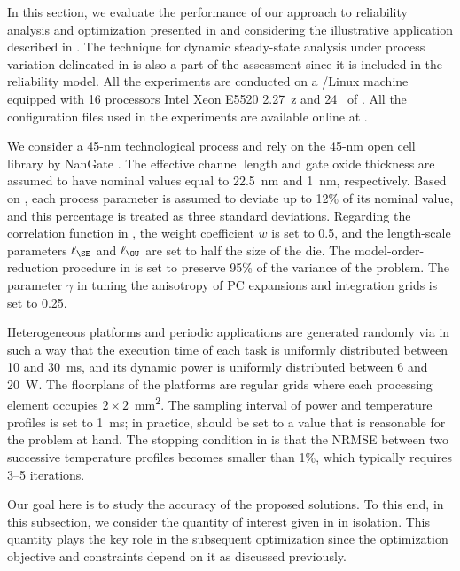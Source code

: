In this section, we evaluate the performance of our approach to reliability
analysis and optimization presented in  and
 considering the illustrative application
described in . The technique for dynamic
steady-state analysis under process variation delineated in
 is also a part of the assessment
since it is included in the reliability model. All the experiments are conducted
on a /Linux machine equipped with 16 processors Intel Xeon E5520
2.27~z and 24~ of . All the configuration files used in
the experiments are available online at \cite{eslab2015}.

We consider a 45-nm technological process and rely on the 45-nm open cell
library by NanGate \cite{nangate}. The effective channel length and gate oxide
thickness are assumed to have nominal values equal to 22.5~nm and 1~nm,
respectively. Based on  \cite{itrs}, each process parameter is assumed
to deviate up to 12\% of its nominal value, and this percentage is treated as
three standard deviations. Regarding the correlation function in
, the weight coefficient $w$ is set to 0.5, and the
length-scale parameters $\ell_\SE$ and $\ell_\OU$ are set to half the size of
the die. The model-order-reduction procedure in
 is set to preserve 95\% of the variance of the
problem. The parameter $\gamma$ in  tuning the
anisotropy of \ac{PC} expansions and integration grids is set to 0.25.

Heterogeneous platforms and periodic applications are generated randomly via
 \cite{dick1998} in such a way that the execution time of each task is
uniformly distributed between 10 and 30~ms, and its dynamic power is uniformly
distributed between 6 and 20~W. The floorplans of the platforms are regular
grids where each processing element occupies $2 \times 2$~mm\textsuperscript{2}.
The sampling interval \dt of power and temperature profiles is set to 1~ms; in
practice, \dt should be set to a value that is reasonable for the problem at
hand. The stopping condition in  is
that the \ac{NRMSE} between two successive temperature profiles becomes smaller
than 1\%, which typically requires 3--5 iterations.


Our goal here is to study the accuracy of the proposed solutions. To this end,
in this subsection, we consider the quantity of interest given in
 in isolation. This quantity plays the key
role in the subsequent optimization since the optimization objective and
constraints depend on it as discussed previously.

